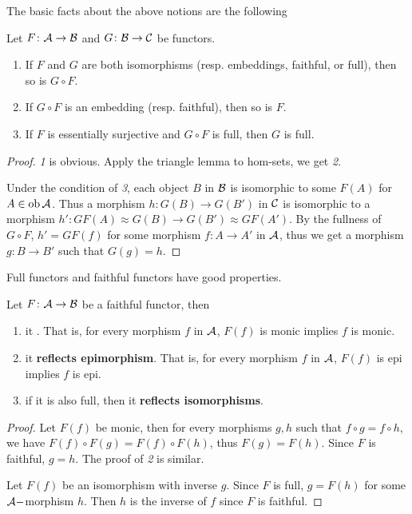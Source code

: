   The basic facts about the above notions are the following
  \begin{prop}\label{prop:tri-(full,faithful)}
    Let $F\colon{\cal A}\to{\cal B}$ and $G\colon{\cal B}\to{\cal C}$ be functors.
    \begin{enumerate}
      \item If $F$ and $G$ are both isomorphisms (resp. embeddings, faithful, or full), then so is $G\circ F$.
      \item If $G\circ F$ is an embedding (resp. faithful), then so is $F$.
      \item If $F$ is essentially surjective and $G\circ F$ is full, then $G$ is full.
    \end{enumerate}
  \end{prop}
  \begin{proof}
    \emph{1} is obvious. Apply the triangle lemma to hom-sets, we get \emph{2}.

    Under the condition of \emph{3}, each object $B$ in ${\cal B}$ is isomorphic to some $F(A)$ for $A\in\operatorname{ob}{\cal A}$. Thus a morphism $h\colon G(B)\to G(B')$ in ${\cal C}$ is isomorphic to a morphism $h'\colon GF(A)\approx G(B)\to G(B')\approx GF(A')$. By the fullness of $G\circ F$, $h'=GF(f)$ for some morphism $f\colon A\to A'$ in ${\cal A}$, thus we get a morphism $g\colon B\to B'$ such that $G(g)=h$.
  \end{proof}

  Full functors and faithful functors have good properties.
  \begin{prop}
    Let $F\colon{\cal A}\to{\cal B}$ be a faithful functor, then
    \begin{enumerate}
      \item it . That is, for every morphism $f$ in ${\cal A}$, $F(f)$ is monic implies $f$ is monic.
      \item it \textbf{reflects epimorphism}. That is, for every morphism $f$ in ${\cal A}$, $F(f)$ is epi implies $f$ is epi.
      \item if it is also full, then it \textbf{reflects isomorphisms}.
    \end{enumerate}
  \end{prop}
  \begin{proof}
    Let $F(f)$ be monic, then for every morphisms $g,h$ such that $f\circ g=f\circ h$, we have $F(f)\circ F(g) = F(f)\circ F(h)$, thus $F(g)=F(h)$. Since $F$ is faithful, $g=h$. The proof of \emph{2} is similar.

    Let $F(f)$ be an isomorphism with inverse $g$. Since $F$ is full, $g=F(h)$ for some ${\cal A}-$morphism $h$. Then $h$ is the inverse of $f$ since $F$ is faithful.
  \end{proof}

